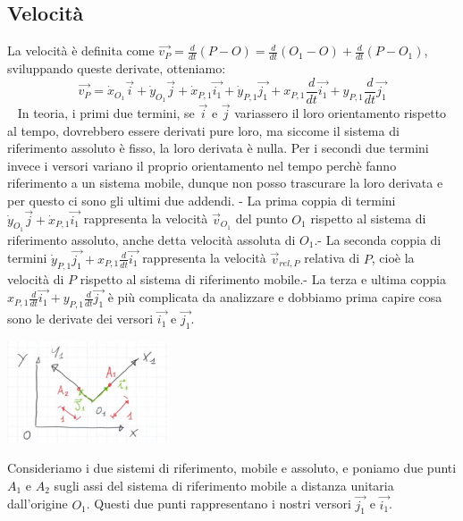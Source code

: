 \subsection{Velocità}
La velocità è definita come $\vec{v_P} = \frac{d}{dt} (P-O) = \frac{d}{dt} (O_1 - O) + \frac{d}{dt} (P-O_1)$, sviluppando queste derivate, otteniamo: 
\[
    \vec{v_P} = 
        \dot{x}_{O_1}\vec{i} + 
        \dot{y}_{O_1} \vec{j} + 
        \dot{x}_{P,1} \vec{i_1} + 
        \dot{y}_{P,1} \vec{j_1} + 
        x_{P,1} \frac{d}{dt}\vec{i_1} + 
        y_{P,1} \frac{d}{dt} \vec{j_1}
\]
\ \newline
In teoria, i primi due termini, se $\vec{i}$ e $\vec{j}$ variassero il loro orientamento rispetto al tempo, dovrebbero essere derivati pure loro, ma siccome il sistema di riferimento assoluto è fisso, la loro derivata è nulla.\newline
Per i secondi due termini invece i versori variano il proprio orientamento nel tempo perchè fanno riferimento a un sistema mobile, dunque non posso trascurare la loro derivata e per questo ci sono gli ultimi due addendi.\newline
{}- La prima coppia di termini $\dot{y}_{O_1} \vec{j} + \dot{x}_{P,1} \vec{i_1}$ rappresenta la velocità $\vec{v}_{O_1}$ del punto $O_1$ rispetto al sistema di riferimento assoluto, anche detta velocità assoluta di $O_1$.- La seconda coppia di termini $\dot{y}_{P,1} \vec{j_1} + x_{P,1} \frac{d}{dt}\vec{i_1}$ rappresenta la velocità $\vec{v}_{rel, P}$ relativa di $P$, cioè la velocità di $P$ rispetto al sistema di riferimento mobile.- La terza e ultima coppia $x_{P,1} \frac{d}{dt}\vec{i_1} + y_{P,1} \frac{d}{dt} \vec{j_1}$ è più complicata da analizzare e dobbiamo prima capire cosa sono le derivate dei versori $\vec{i_1}$ e $\vec{j_1}$.\newline
{}
\begin{center}
    \includegraphics[height=3cm]{../lezione3/img4.JPG}
\end{center}
Consideriamo i due sistemi di riferimento, mobile e assoluto, e poniamo due punti $A_1$ e $A_2$ sugli assi del sistema di riferimento mobile a distanza unitaria dall'origine $O_1$. Questi due punti rappresentano i nostri versori $\vec{j_1}$ e $\vec{i_1}$.
